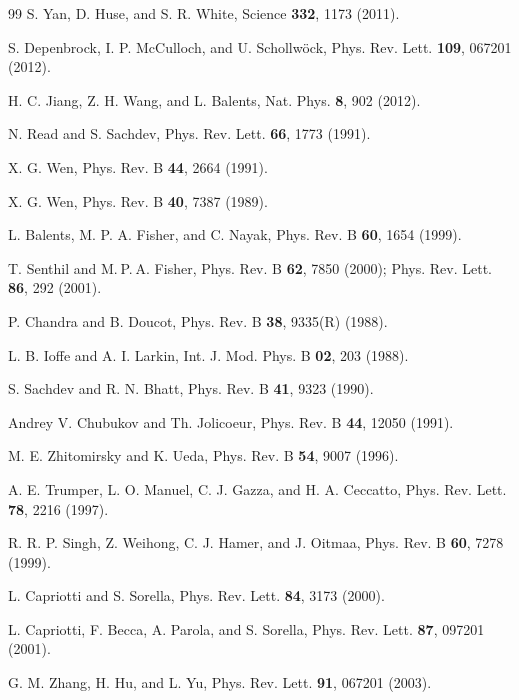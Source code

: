 \documentclass[prl,aps,epsf,showpacs,twocolumn]{revtex4}
\begin{document}
\begin{thebibliography}{99}
 S. Yan, D. Huse, and S. R. White, Science \textbf{332}, 1173 (2011).

 S. Depenbrock, I. P. McCulloch, and U. Schollw\"{o}ck, Phys. Rev. Lett. \textbf{109}, 067201 (2012).

 H. C. Jiang, Z. H. Wang, and L. Balents, Nat. Phys. \textbf{8}, 902 (2012).

 N. Read and S. Sachdev, Phys. Rev. Lett. \textbf{66}, 1773 (1991).

 X. G. Wen, Phys. Rev. B \textbf{44}, 2664 (1991).

 X. G. Wen, Phys. Rev. B \textbf{40}, 7387 (1989).

 L. Balents, M. P. A. Fisher, and C. Nayak, Phys. Rev. B \textbf{60}, 1654 (1999).

 T. Senthil and M. P. A. Fisher, Phys. Rev. B \textbf{62}, 7850 (2000); Phys. Rev. Lett. \textbf{86}, 292 (2001).


 P. Chandra and B. Doucot, Phys. Rev. B \textbf{38}, 9335(R) (1988).

 L. B. Ioffe and A. I. Larkin, Int. J. Mod. Phys. B \textbf{02}, 203 (1988).

 S. Sachdev and R. N. Bhatt, Phys. Rev. B \textbf{41}, 9323 (1990).

 Andrey V. Chubukov and Th. Jolicoeur, Phys. Rev. B \textbf{44}, 12050 (1991). %

 M. E. Zhitomirsky and K. Ueda, Phys. Rev. B \textbf{54}, 9007 (1996).

 A. E. Trumper, L. O. Manuel, C. J. Gazza, and H. A. Ceccatto, Phys. Rev. Lett. \textbf{78}, 2216 (1997). %

 R. R. P. Singh, Z. Weihong, C. J. Hamer, and J. Oitmaa, Phys. Rev. B \textbf{60}, 7278 (1999). %

 L. Capriotti and S. Sorella, Phys. Rev. Lett. \textbf{84}, 3173 (2000).

 L. Capriotti, F. Becca, A. Parola, and S. Sorella, Phys. Rev. Lett. \textbf{87}, 097201 (2001).

 G. M. Zhang, H. Hu, and L. Yu, Phys. Rev. Lett. \textbf{91}, 067201 (2003). %


\end{thebibliography}
\end{document}
